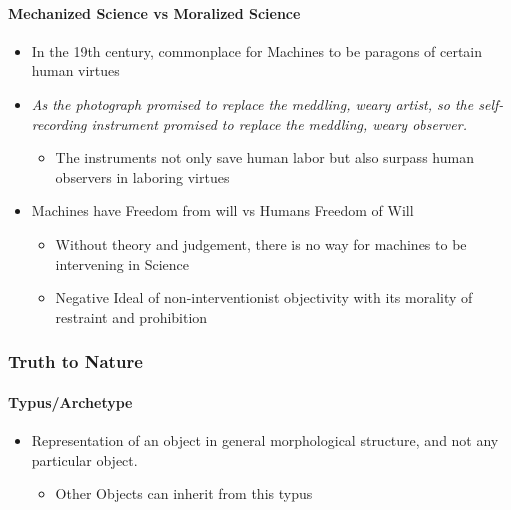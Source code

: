 \documentclass[a4paper]{article}
\begin{document}
\paragraph{Mechanized Science vs Moralized Science}
\begin{itemize}
	\item In the 19th century, commonplace for Machines to be paragons of certain human virtues
	\item \textit{As the photograph promised to replace the meddling, weary artist, so the self-recording instrument promised to replace the meddling, weary observer.}
	\begin{itemize}[label=$\circ$]
		\item The instruments not only save human labor but also surpass human observers in laboring virtues
	\end{itemize}
	\item Machines have Freedom from will vs Humans Freedom of Will
	\begin{itemize}[label=$\circ$]
		\item Without theory and judgement, there is no way for machines to be intervening in Science
		\item Negative Ideal of non-interventionist objectivity with its morality of restraint and prohibition
	\end{itemize}
\end{itemize}

\subsubsection{Truth to Nature}
\paragraph{Typus/Archetype}
\begin{itemize}
	\item Representation of an object in general morphological structure, and not any particular object.
	\begin{itemize}[label=$\circ$]
		\item Other Objects can inherit from this typus
	\end{itemize}
\end{itemize}
\end{document}

